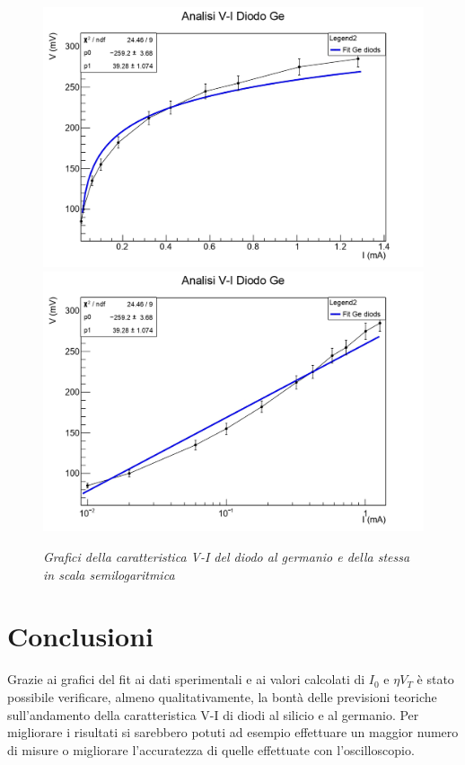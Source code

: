 \documentclass{article}
\begin{document}
\begin{figure}[]
  \centering
  \includegraphics[scale=0.55]{GeLog.jpg}
  \qquad
  \includegraphics[scale=0.55]{GeLin.jpg}
  \qquad
  \caption{\textit{Grafici della caratteristica V-I del diodo al germanio e della stessa in scala semilogaritmica}}
\end{figure}




\section{Conclusioni}
Grazie ai grafici del fit ai dati sperimentali e ai valori calcolati di $I_0$ e $\eta V_T$ è stato possibile verificare,
almeno qualitativamente, la bontà delle previsioni teoriche sull'andamento della caratteristica V-I di diodi al silicio e al germanio.
Per migliorare i risultati si sarebbero potuti ad esempio effettuare un maggior numero di misure o migliorare l'accuratezza di quelle effettuate con l'oscilloscopio.
\end{document}
